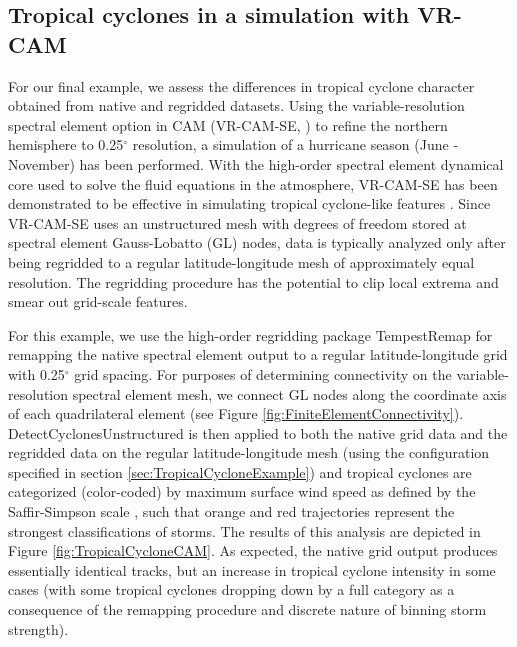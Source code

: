 \documentclass[gmdd, hvmath]{copernicus}
\begin{document}
\subsection{Tropical cyclones in a simulation with VR-CAM} \label{sec:TropicalCycloneCAM}

For our final example, we assess the differences in tropical cyclone character obtained from native and regridded datasets. Using the variable-resolution spectral element option in CAM (VR-CAM-SE, \citet{Neale2012, Zarzycki2014APE}) to refine the northern hemisphere to 0.25$^\circ$ resolution, a simulation of a hurricane season (June - November) has been performed. With the high-order spectral element dynamical core used to solve the fluid equations in the atmosphere, VR-CAM-SE has been demonstrated to be effective in simulating tropical cyclone-like features \citep{zarzycki2014multidecadal, Zarzycki2014MWR, Zarzycki2015TCForecast}. Since VR-CAM-SE uses an unstructured mesh with degrees of freedom stored at spectral element Gauss-Lobatto (GL) nodes, data is typically analyzed only after being regridded to a regular latitude-longitude mesh of approximately equal resolution.  The regridding procedure has the potential to clip local extrema and smear out grid-scale features.

For this example, we use the high-order regridding package TempestRemap \citep{ullrich2015arbitrary, ullrich2016arbitrary} for remapping the native spectral element output to a regular latitude-longitude grid with 0.25$^\circ$ grid spacing.  For purposes of determining connectivity on the variable-resolution spectral element mesh, we connect GL nodes along the coordinate axis of each quadrilateral element (see Figure \ref{fig:FiniteElementConnectivity}).  DetectCyclonesUnstructured is then applied to both the native grid data and the regridded data on the regular latitude-longitude mesh (using the configuration specified in section \ref{sec:TropicalCycloneExample}) and tropical cyclones are categorized (color-coded) by maximum surface wind speed as defined by the Saffir-Simpson scale \citep{Simpson1974}, such that orange and red trajectories represent the strongest classifications of storms.  The results of this analysis are depicted in Figure \ref{fig:TropicalCycloneCAM}.  As expected, the native grid output produces essentially identical tracks, but an increase in tropical cyclone intensity in some cases (with some tropical cyclones dropping down by a full category as a consequence of the remapping procedure and discrete nature of binning storm strength).
\end{document}
